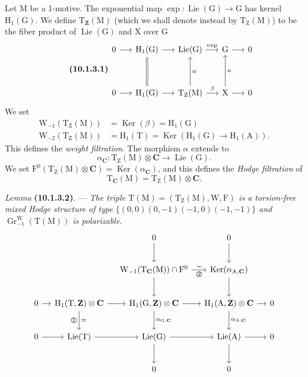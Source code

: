 \documentclass[11pt,leqno]{article}
\begin{document}
Let \(\mathrm{M}\) be a 1-motive. The exponential map
\(\exp:\operatorname{Lie}(\mathrm{G})\to\mathrm{G}\) has kernel
\(\mathrm{H}_1(\mathrm{G})\). We define
\(\mathrm{T}_{\mathbf{Z}}(\mathrm{M})\) (which we shall denote instead by
\(\mathrm{T}_{\mathrm{Z}}(\mathrm{M})\)) to be the fiber product
of \(\operatorname{Lie}(\mathrm{G})\) and \(\mathrm{X}\) over
\(\mathrm{G}\)
\[
\tag*{\textbf{(10.1.3.1)}}
\begin{tikzcd}[column sep=1.5em, row sep=3.5em]
0 \arrow[r]
& \mathrm{H}_1(\mathrm{G}) \arrow[r]
& \operatorname{Lie}(\mathrm{G}) \arrow[r, "\exp"]
& \mathrm{G} \arrow[r]
& 0
\\
0 \arrow[r]
& \mathrm{H}_1(\mathrm{G}) \arrow[r] \arrow[u, equal]
& \mathrm{T}_{\mathrm{Z}}(\mathrm{M})
    \arrow[r, "\beta"] \arrow[u, "\alpha"']
& \mathrm{X} \arrow[r] \arrow[u, "u"']
& 0
\end{tikzcd}
\]
We set
\[
\begin{aligned}
\mathrm{W}_{-1}(\mathrm{T}_{\mathrm{Z}}(\mathrm{M}))
  &=\operatorname{Ker}(\beta)=\mathrm{H}_1(\mathrm{G})
\\
\mathrm{W}_{-2}(\mathrm{T}_{\mathrm{Z}}(\mathrm{M}))
  &=\mathrm{H}_1(\mathrm{T})
    =\operatorname{Ker}(\mathrm{H}_1(\mathrm{G})\to\mathrm{H}_1(\mathrm{A})).
\end{aligned}
\]
This defines the \textit{weight filtration}. The morphism
\(\alpha\) extends to
\[
\alpha_{\mathbf{C}}:
\mathrm{T}_{\mathrm{Z}}(\mathrm{M})\otimes\mathbf{C}
\to\operatorname{Lie}(\mathrm{G}).
\]
We set
\(\mathrm{F}^0(\mathrm{T}_{\mathrm{Z}}(\mathrm{M})\otimes\mathbf{C})
=\operatorname{Ker}(\alpha_{\mathbf{C}})\), and this defines the
\textit{Hodge filtration} of
\[
\mathrm{T}_{\mathbf{C}}(\mathrm{M})
=\mathrm{T}_{\mathrm{Z}}(\mathrm{M})\otimes\mathbf{C}.
\]

\textit{Lemma} \textbf{(10.1.3.2)}. —
\textit{The triple
\(\mathrm{T}(\mathrm{M})=(\mathrm{T}_{\mathrm{Z}}(\mathrm{M}),
\mathrm{W},\mathrm{F})\) is a torsion-free mixed Hodge structure
of type \(\{(0,0)(0,-1)(-1,0)(-1,-1)\}\) and
\(\operatorname{Gr}^{\mathrm{W}}_{-1}(\mathrm{T}(\mathrm{M}))\)
is polarizable.}
\[
\begin{tikzcd}[column sep=1.1em, row sep=2.3em]
& & 0 \arrow[d] & 0 \arrow[d] &
\\
& &
\mathrm{W}_{-1}(\mathrm{T}_{\mathbf{C}}(\mathrm{M}))\cap\mathrm{F}^0
  \arrow[r, "\sim", "{\text{\textcircled{2}}}"']
  \arrow[d]
&
\operatorname{Ker}(\alpha_{\mathrm{A},\mathbf{C}})
  \arrow[d]
&
\\
0 \arrow[r]
&
\mathrm{H}_1(\mathrm{T},\mathbf{Z})\otimes\mathbf{C}
  \arrow[r]
  \arrow[d, "\approx", "{\text{\textcircled{1}}}"']
&
\mathrm{H}_1(\mathrm{G},\mathbf{Z})\otimes\mathbf{C}
  \arrow[r]
  \arrow[d, "{\alpha_{\mathrm{G},\mathbf{C}}}"]
&
\mathrm{H}_1(\mathrm{A},\mathbf{Z})\otimes\mathbf{C}
  \arrow[r]
  \arrow[d, "{\alpha_{\mathrm{A},\mathbf{C}}}"]
&
0
\\
0 \arrow[r]
&
\operatorname{Lie}(\mathrm{T}) \arrow[r]
&
\operatorname{Lie}(\mathrm{G}) \arrow[r] \arrow[d]
&
\operatorname{Lie}(\mathrm{A}) \arrow[r] \arrow[d]
&
0
\\
& & 0 & 0 &
\end{tikzcd}
\]
\end{document}
